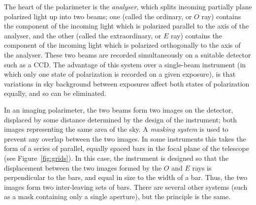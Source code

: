 The heart of the polarimeter is the {\em analyser}, which splits incoming
partially plane polarized light up into two beams; one (called the
ordinary, or $O$ ray) contains the component of the incoming light
which is polarized parallel to the axis of the analyser, and the other
(called the extraordinary, or $E$ ray) contains the component of the
incoming light which is polarized orthogonally to the axis of the
analyser. These two beams are recorded simultaneously on a suitable
detector such as a CCD. The advantage of this system over a single-beam
instrument (in which only one state of polarization is recorded on a
given exposure), is that variations in sky background between exposures
affect both states of polarization equally, and so can be eliminated.

In an imaging polarimeter, the two beams form two images on the detector,
displaced by some distance determined by the design of the instrument;
both images representing the same area of the sky. A {\em masking system}
is used to prevent any overlap between the two images. In some
instruments this takes the form of a series of parallel, equally spaced
bars in the focal plane of the telescope (see Figure~\ref{fig:grids}). In
this case, the instrument is designed so that the displacement between
the two images formed by the $O$ and $E$ rays is perpendicular to the
bars, and equal in size to the width of a bar. Thus, the two images form
two inter-leaving sets of bars. There are several other systems (such as 
a mask containing only a single aperture), but the principle is the same.

